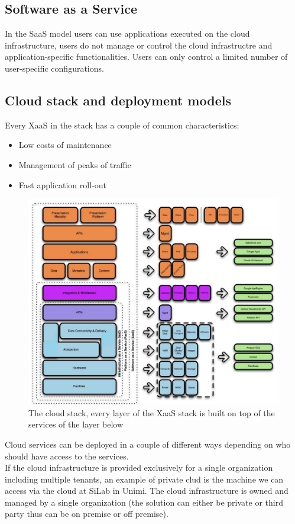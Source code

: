 \subsection{Software as a Service}
In the SaaS model users can use applications executed on the cloud infrastructure, users do not manage or control the cloud infrastructre and application-specific functionalities. Users can only control a limited number of user-specific configurations.
\subsection{Cloud stack and deployment models}
Every XaaS in the stack has a couple of common characteristics:
\begin{itemize}
    \item Low costs of maintenance
    \item Management of peaks of traffic
    \item Fast application roll-out
\end{itemize}
\begin{figure}
    \centering
    \includegraphics[scale=0.2]{./Images/cloud_stack.jpeg}
    \caption{The cloud stack, every layer of the XaaS stack is built on top of the services of the layer below}
\end{figure}
Cloud services can be deployed in a couple of different ways depending on who should have access to the services. \\
If the cloud infrastructure is provided exclusively for a single organization including multiple tenants, an example of private clud is the machine we can access via the cloud at SiLab in Unimi. The cloud infrastructure is owned and managed by a single organization (the solution can either be private or third party thus can be on premise or off premise). \\
